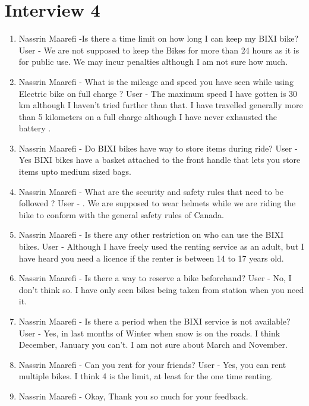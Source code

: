 \section{Interview 4}
\begin{enumerate}
    \item Nassrin Maarefi -Is there a time limit on how long I can keep my BIXI bike?
    \newline User - We are not supposed to keep the Bikes for more than 24 hours as it is for public use. We may incur penalties although I am not sure how much.
    \item Nassrin Maarefi - What is the mileage and speed you have seen while using Electric bike on full charge ?
    \newline User - The maximum speed I have gotten is 30 km although I haven’t tried further than that. I have travelled generally more than 5 kilometers on a full charge although I have never exhausted the battery . 
    \item Nassrin Maarefi - Do BIXI bikes have way to store items during ride?
    \newline User - Yes BIXI bikes have a basket attached to the front handle that lets you store items upto medium sized bags.
    \item Nassrin Maarefi - What are the security and safety rules that need to be followed ?
    \newline User - . We are supposed to wear helmets while we are riding the bike to conform with the general safety rules of Canada.
    \item Nassrin Maarefi - Is there any other restriction on who can use the BIXI bikes.
    \newline User - Although I have freely used the renting service as an adult, but I have heard you need a licence if the renter is between 14 to 17 years old.
    \item Nassrin Maarefi - Is there a way to reserve a bike beforehand?
    \newline User - No, I don’t think so. I have only seen bikes being taken from station when you need it.
    \item Nassrin Maarefi - Is there a period when the BIXI service is not available?
    \newline User - Yes, in last months of Winter when snow is on the roads. I think December, January you can’t. I am not sure about March and November.
    \item  Nassrin Maarefi - Can you rent for your friends?
    \newline User - Yes, you can rent multiple bikes. I think 4 is the limit, at least for the one time renting. 
    \item Nassrin Maarefi - Okay, Thank you so much for your feedback.
\end{enumerate}






